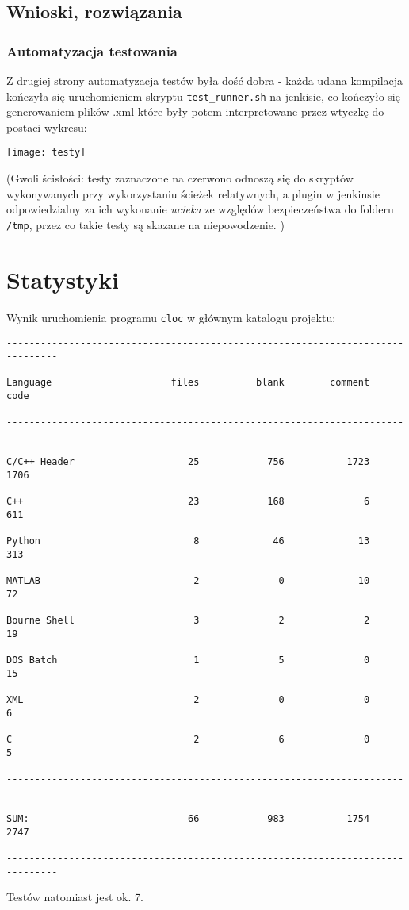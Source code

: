\documentclass{article}
\begin{document}
	\subsection{Wnioski, rozwiązania}
 	
 	\subsubsection{Automatyzacja testowania}
 	Z drugiej strony automatyzacja testów była dość dobra - każda udana kompilacja kończyła się uruchomieniem skryptu \texttt{test\_runner.sh} na jenkisie, co kończyło się generowaniem plików .xml które były potem interpretowane przez wtyczkę do postaci wykresu:
 	
 	
 	\texttt{[image: testy]} 
 	
 	(Gwoli ścisłości: testy zaznaczone na czerwono odnoszą się do skryptów wykonywanych przy wykorzystaniu ścieżek relatywnych, a plugin w jenkinsie odpowiedzialny za ich wykonanie \textit{ucieka} ze względów bezpieczeństwa do folderu \texttt{/tmp}, przez co takie testy są skazane na niepowodzenie. )
 	
 	
\section{Statystyki}
Wynik uruchomienia programu \texttt{cloc} w głównym katalogu projektu:

\newpage

\begin{verbatim}
-------------------------------------------------------------------------------

Language                     files          blank        comment           code

-------------------------------------------------------------------------------

C/C++ Header                    25            756           1723           1706

C++                             23            168              6            611

Python                           8             46             13            313

MATLAB                           2              0             10             72

Bourne Shell                     3              2              2             19

DOS Batch                        1              5              0             15

XML                              2              0              0              6

C                                2              6              0              5

-------------------------------------------------------------------------------

SUM:                            66            983           1754           2747

-------------------------------------------------------------------------------

\end{verbatim}

Testów natomiast jest ok. 7.
\end{document}
